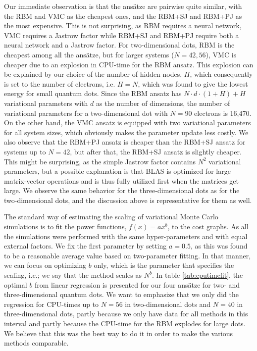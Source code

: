 Our immediate observation is that the ansätze are pairwise quite similar, with the RBM and VMC as the cheapest ones, and the RBM+SJ and RBM+PJ as the most expensive. This is not surprising, as RBM requires a neural network, VMC requires a Jastrow factor while RBM+SJ and RBM+PJ require both a neural network and a Jastrow factor. For two-dimensional dots, RBM is the cheapest among all the ansätze, but for larger systems ($N=42,56$), VMC is cheaper due to an explosion in CPU-time for the RBM ansatz. This explosion can be explained by our choice of the number of hidden nodes, $H$, which consequently is set to the number of electrons, i.e. $H=N$, which was found to give the lowest energy for small quantum dots\supercite{flugsrud_vilde_moe_solving_nodate}. Since the RBM ansatz has $N\cdot d\cdot (1+H)+H$ variational parameters with $d$ as the number of dimensions, the number of variational parameters for a two-dimensional dot with $N=90$ electrons is 16,470. On the other hand, the VMC ansatz is equipped with two variational parameters for all system sizes, which obviously makes the parameter update less costly. We also observe that the RBM+PJ ansatz is cheaper than the RBM+SJ ansatz for systems up to $N=42$, but after that, the RBM+SJ ansatz is slightly cheaper. This might be surprising, as the simple Jastrow factor contains $N^2$ variational parameters, but a possible explanation is that BLAS is optimized for large matrix-vector operations and is thus fully utilized first when the matrices get large. We observe the same behavior for the three-dimensional dots as for the two-dimensional dots, and the discussion above is representative for them as well.

The standard way of estimating the scaling of variational Monte Carlo simulations is to fit the power functions, $f(x)=ax^b$, to the cost graphs. As all the simulations were performed with the same hyper-parameters and with equal external factors. We fix the first parameter by setting $a=0.5$, as this was found to be a reasonable average value based on two-parameter fitting. In that manner, we can focus on optimizing $b$ only, which is the parameter that specifies the scaling, i.e.; we say that the method scales as $N^b$. In table \eqref{tab:cputimefit}, the optimal $b$ from linear regression is presented for our four ansätze for two- and three-dimensional quantum dots. We want to emphasize that we only did the regression for CPU-times up to $N=56$ in two-dimensional dots and $N=40$ in three-dimensional dots, partly because we only have data for all methods in this interval and partly because the CPU-time for the RBM explodes for large dots. We believe that this was the best way to do it in order to make the various methods comparable. 

